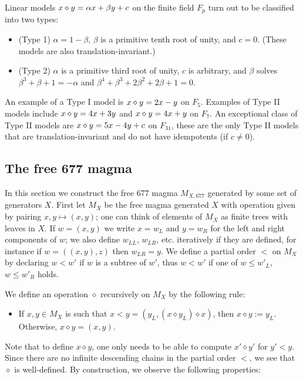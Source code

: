 Linear models $x \diamond y = \alpha x + \beta y + c$ on the finite field $F_p$ turn out to be classified into two types:
\begin{itemize}
\item (Type 1) $\alpha=1-\beta$, $\beta$ is a primitive tenth root of unity, and $c=0$.  (These models are also translation-invariant.)
\item (Type 2) $\alpha$ is a primitive third root of unity, $c$ is arbitrary, and $\beta$ solves $\beta^3+\beta+1=-\alpha$ and $\beta^4+\beta^3+2\beta^2+2\beta+1=0$.
\end{itemize}
An example of a Type I model is $x \diamond y = 2x-y$ on $F_5$.  Examples of Type II models include $x \diamond y = 4x+3y$ and $x \diamond y = 4x+y$ on $F_7$.  An exceptional class of Type II models are $x \diamond y = 5x-4y+c$ on $F_{31}$, these are the only Type II models that are translation-invariant and do not have idempotents (if $c \neq 0$).

\subsection{The free 677 magma}

In this section we construct the free 677 magma $M_{X,677}$ generated by some set of generators $X$.  First let $M_X$ be the free magma generated $X$ with operation given by pairing $x,y \mapsto (x,y)$; one can think of elements of $M_X$ as finite trees with leaves in $X$.  If $w = (x,y)$ we write $x = w_L$ and $y = w_R$ for the left and right components of $w$; we also define $w_{LL}$, $w_{LR}$, etc. iteratively if they are defined, for instance if $w = ((x,y),z)$ then $w_{LR} = y$.  We define a partial order $<$ on $M_X$ by declaring $w < w'$ if $w$ is a subtree of $w'$, thus $w < w'$ if one of $w \leq w'_L$, $w \leq w'_R$ holds.

We define an operation $\diamond$ recursively on $M_X$ by the following rule:
\begin{itemize}
\item If $x,y \in M_X$ is such that $x < y = (y_L, (x \diamond y_L) \diamond x)$, then $x \diamond y := y_L$.  Otherwise, $x \diamond y = (x,y)$.
\end{itemize}

Note that to define $x \diamond y$, one only needs to be able to compute $x' \diamond y'$ for $y' < y$.  Since there are no infinite descending chains in the partial order $<$, we see that $\diamond$ is well-defined.  By construction, we observe the following properties:

